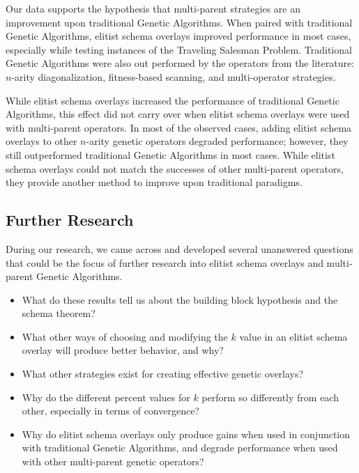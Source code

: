 Our data supports the hypothesis that multi-parent strategies are an improvement upon traditional Genetic Algorithms. When paired with traditional Genetic Algorithms, elitist schema overlays improved performance in most cases, especially while testing instances of the Traveling Salesman Problem. Traditional Genetic Algorithms were also out performed by the operators from the literature: $n$-arity diagonalization, fitness-based scanning, and multi-operator strategies. 

While elitist schema overlays increased the performance of traditional Genetic Algorithms, this effect did not carry over when elitist schema overlays were used with multi-parent operators. In most of the observed cases, adding elitist schema overlays to other $n$-arity genetic operators degraded performance; however, they still outperformed traditional Genetic Algorithms in most cases. While elitist schema overlays could not match the successes of other multi-parent operators, they provide another method to improve upon traditional paradigms.

\subsection*{Further Research}
During our research, we came across and developed several unanswered questions that could be the focus of further research into elitist schema overlays and multi-parent Genetic Algorithms.

\begin{itemize}
\item What do these results tell us about the building block hypothesis and the schema theorem?

\item What other ways of choosing and modifying the $k$ value in an elitist schema overlay will produce better behavior, and why?

\item What other strategies exist for creating effective genetic overlays?

\item Why do the different percent values for $k$ perform so differently from each other, especially in terms of convergence?

\item Why do elitist schema overlays only produce gains when used in conjunction with traditional Genetic Algorithms, and degrade performance when used with other multi-parent genetic operators?
\end{itemize}
